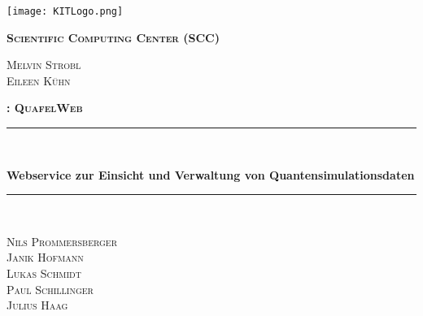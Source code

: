\begin{titlepage}
  \centering
  \texttt{[image: KITLogo.png]}\par\vspace{1cm}
  	{\scshape \bfseries Scientific Computing Center (SCC) \par}
  	\vspace{0.25cm}
  	{\scshape Melvin Strobl\\Eileen Kühn\par}
  	\vspace{1.5cm}

    {\scshape \Large \bfseries \@title{}: QuafelWeb\par}
    \newcommand{\HRule}{\rule{\linewidth}{0.5mm}}
    {\color{mintgreen}\HRule} \\[0.4cm]
  	{\huge \bfseries \LARGE Webservice zur Einsicht und Verwaltung von Quantensimulationsdaten\par}
    {\color{mintgreen}\HRule} \\[1cm]
  	\vspace{2cm}
  	{\scshape \Large Nils Prommersberger\\Janik Hofmann\\Lukas Schmidt\\Paul Schillinger\\Julius Haag\par}
  	\vfill

\end{titlepage}
